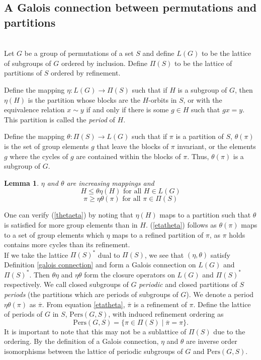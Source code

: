\documentclass[psamsfonts]{amsart}
\newtheorem{lem}[thm]{Lemma}
\theoremstyle{definition}
\theoremstyle{remark}
\numberwithin{equation}{section}
\begin{document}
\subsection{A Galois connection between permutations and partitions}\hfill\\
\indent Let $G$ be a group of permutations of a set $S$ and define $L(G)$ to be the lattice of subgroups of $G$ ordered by inclusion. Define $\Pi(S)$ to be the lattice of partitions of $S$ ordered by refinement.

\indent Define the mapping $\eta : L(G)\to \Pi(S)$ such that if $H$ is a subgroup of $G$, then $\eta(H)$ is the partition whose blocks are the $H$-orbits in $S$, or with the equivalence relation $x\sim y$ if and only if there is some $g\in H$ such that $gx=y$. This partition is called the \textit{period} of $H$.

\indent Define the mapping $\theta:\Pi(S)\to L(G)$ such that if $\pi$ is a partition of $S$, $\theta(\pi)$ is the set of group elements $g$ that leave the blocks of $\pi$ invariant, or the elements $g$ where the cycles of $g$ are contained within the blocks of $\pi$. Thus, $\theta(\pi)$ is a subgroup of $G$.

\begin{lem}
$\eta$ and $\theta$ are increasing mappings and 
\begin{equation}\label{thetaeta}
    H\leq \theta\eta(H) \text{ for all } H\in L(G)
\end{equation}
\begin{equation}\label{etatheta}
    \pi\geq \eta\theta(\pi) \text{ for all } \pi\in \Pi(S)
\end{equation}
\end{lem}
\indent One can verify  (\ref{thetaeta}) by noting that $\eta(H)$ maps to a partition such that $\theta$ is satisfied for more group elements than in $H$. (\ref{etatheta}) follows as $\theta(\pi)$ maps to a set of group elements which $\eta$ maps to a refined partition of $\pi$, as $\pi$ holds contains more cycles than its refinement.\\
\indent If we take the lattice $\Pi(S)^*$ dual to $\Pi(S)$, we see that $(\eta, \theta)$ satisfy Definition \ref{galois connection} and form a Galois connection on $L(G)$ and $\Pi(S)^*$. Then $\theta\eta$ and $\eta\theta$ form the closure operators on $L(G)$ and $\Pi(S)^*$ respectively. We call closed subgroups of $G$ \textit{periodic} and closed partitions of $S$ \textit{periods} (the partitions which are periods of subgroups of $G$). We denote a period $\eta\theta(\pi)$ as $\overline{\pi}$. From equation \ref{etatheta}, $\overline{\pi}$ is a refinement of $\pi$.
Define the lattice of periods of $G$ in $S$, $\text{Pers}(G,S)$, with induced refinement ordering as
\begin{equation*}
    \text{Pers}(G,S)=\{\pi \in \Pi(S) \mid \overline{\pi}=\pi\}.
\end{equation*}
\indent It is important to note that this may not be a sublattice of $\Pi(S)$ due to the ordering. By the definition of a Galois connection, $\eta$ and $\theta$ are inverse order isomorphisms between the lattice of periodic subgroups of $G$ and $\text{Pers}(G,S)$.
\end{document}
